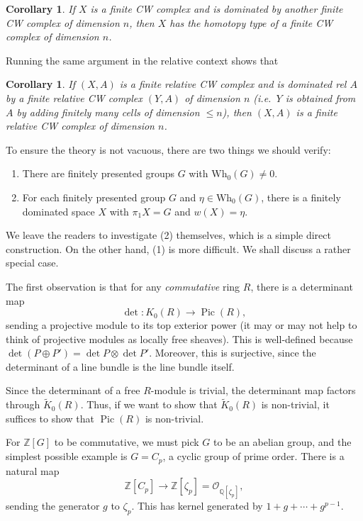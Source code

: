 \documentclass[a4paper, 12pt]{article}
\newtheorem{cor}[thm]{Corollary}
\theoremstyle{definition}
\newcommand\Z{\mathbb{Z}}
\newcommand\Q{\mathbb{Q}}
\newcommand\Wh{\mathrm{Wh}}
\DeclareMathOperator\Pic{Pic}
\begin{document}
\begin{cor}
  If $X$ is a finite CW complex and is dominated by another finite CW complex of dimension $n$, then $X$ has the homotopy type of a finite CW complex of dimension $n$.
\end{cor}

Running the same argument in the relative context shows that
\begin{cor}\label{cor:dim-dom-rel}
  If $(X, A)$ is a finite relative CW complex and is dominated rel $A$ by a finite relative CW complex $(Y, A)$ of dimension $n$ (i.e.\ $Y$ is obtained from $A$ by adding finitely many cells of dimension $\leq n$), then $(X, A)$ is a finite relative CW complex of dimension $n$.
\end{cor}

To ensure the theory is not vacuous, there are two things we should verify:
\begin{enumerate}
  \item There are finitely presented groups $G$ with $\Wh_0(G) \not= 0$.
  \item For each finitely presented group $G$ and $\eta \in \Wh_0(G)$, there is a finitely dominated space $X$ with $\pi_1 X = G$ and $w(X) = \eta$.
\end{enumerate}
We leave the readers to investigate (2) themselves, which is a simple direct construction. On the other hand, (1) is more difficult. We shall discuss a rather special case.

The first observation is that for any \emph{commutative} ring $R$, there is a determinant map
\[
  \det: K_0(R) \to \Pic(R),
\]
sending a projective module to its top exterior power (it may or may not help to think of projective modules as locally free sheaves). This is well-defined because $\det(P \oplus P') = \det P \otimes \det P'$. Moreover, this is surjective, since the determinant of a line bundle is the line bundle itself.

Since the determinant of a free $R$-module is trivial, the determinant map factors through $\tilde{K}_0(R)$. Thus, if we want to show that $\tilde{K}_0(R)$ is non-trivial, it suffices to show that $\Pic(R)$ is non-trivial.

For $\Z[G]$ to be commutative, we must pick $G$ to be an abelian group, and the simplest possible example is $G = C_p$, a cyclic group of prime order. There is a natural map
\[
  \Z[C_p] \to \Z[\zeta_p] = \mathcal{O}_{\Q[\zeta_p]},
\]
sending the generator $g$ to $\zeta_p$. This has kernel generated by $1 + g + \cdots + g^{p - 1}$.
\end{document}
